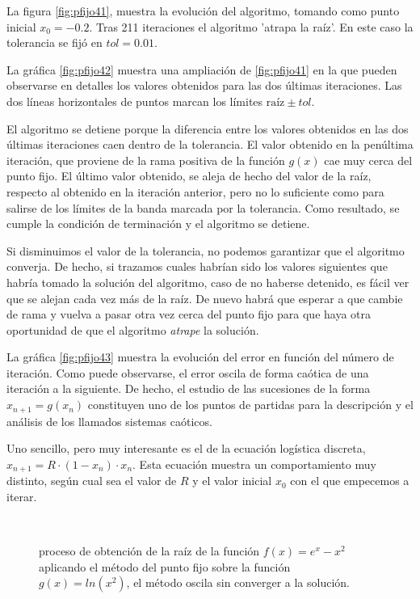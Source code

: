  La figura \ref{fig:pfijo41}, muestra la evolución del algoritmo, tomando como punto inicial $x_0=-0.2$.  Tras 211 iteraciones el algoritmo 'atrapa la raíz'. En este caso la tolerancia se fijó en $tol=0.01$.  
 
 La gráfica \ref{fig:pfijo42} muestra una ampliación de \ref{fig:pfijo41} en la que pueden observarse en detalles los valores obtenidos para las dos últimas iteraciones. Las dos líneas horizontales de puntos marcan los límites $\text{raíz}\pm tol$. 
 
 El algoritmo se detiene porque la diferencia entre los valores obtenidos en las dos últimas iteraciones caen dentro de la tolerancia. El valor obtenido en la penúltima iteración, que proviene de la rama positiva de la función $g(x)$ cae muy cerca del punto fijo. El último valor obtenido, se aleja de hecho del valor de la raíz, respecto al obtenido en la iteración anterior, pero no lo suficiente como para salirse de los límites de la banda marcada por la tolerancia. Como resultado, se cumple la condición de terminación y el algoritmo se detiene.  
 
 Si disminuimos el valor de la tolerancia, no podemos garantizar que el algoritmo converja. De hecho, si trazamos cuales habrían sido los valores siguientes que habría tomado la solución del algoritmo, caso de no haberse detenido, es fácil ver que se alejan cada vez más de la raíz.  De nuevo habrá que esperar a que cambie de rama y vuelva  a pasar otra vez cerca del punto fijo para que haya otra oportunidad de que el algoritmo \emph{atrape} la solución.
 
  La gráfica \ref{fig:pfijo43} muestra la evolución del error en función del número de iteración. Como puede observarse, el error oscila de forma caótica de una iteración a la siguiente. De hecho, el estudio de las sucesiones de la forma $x_{n+1}=g(x_n)$ constituyen uno de los puntos de partidas para la descripción y el análisis de los llamados sistemas caóticos. 

Uno sencillo, pero muy interesante es el de la ecuación logística discreta, $x_{n+1}=R\cdot (1-x_n)\cdot x_n$. Esta ecuación muestra un comportamiento muy distinto, según cual sea el valor de $R$ y el valor inicial $x_0$ con el que empecemos a iterar.
 
 

\begin{figure}[h]
\centering
{} \qquad
{}\\

\caption{proceso de obtención de la raíz de la función $f(x)=e^x-x^2$ aplicando el método del punto fijo sobre la función $g(x)=ln(x^2)$, el método oscila sin converger a la solución.}
\label{fig:pfijo4}
\end{figure}


